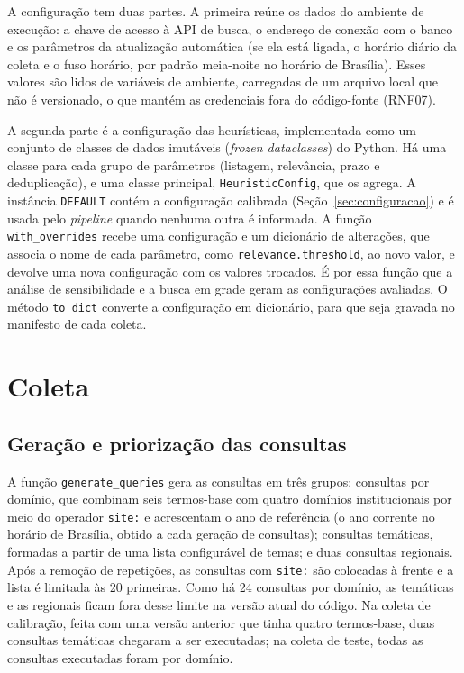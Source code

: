 A configuração tem duas partes. A primeira reúne os dados do ambiente de
execução: a chave de acesso à API de busca, o endereço de conexão com o banco
e os parâmetros da atualização automática (se ela está ligada, o horário
diário da coleta e o fuso horário, por padrão meia-noite no horário de
Brasília). Esses valores são lidos de variáveis
de ambiente, carregadas de um arquivo local que não é versionado, o que mantém
as credenciais fora do código-fonte (RNF07).

A segunda parte é a configuração das heurísticas, implementada como um conjunto
de classes de dados imutáveis (\textit{frozen dataclasses}) do Python. Há uma
classe para cada grupo de parâmetros (listagem, relevância, prazo e
deduplicação), e uma classe principal, \texttt{HeuristicConfig}, que os
agrega. A instância \texttt{DEFAULT} contém a configuração calibrada
(Seção~\ref{sec:configuracao}) e é usada pelo \textit{pipeline} quando nenhuma
outra é informada. A função \texttt{with\_overrides} recebe uma configuração e
um dicionário de alterações, que associa o nome de cada parâmetro, como
\texttt{relevance.threshold}, ao novo valor, e devolve uma nova configuração com os valores trocados. É por essa função que a
análise de sensibilidade e a busca em grade geram as configurações avaliadas.
O método \texttt{to\_dict} converte a configuração em dicionário, para que seja
gravada no manifesto de cada coleta.

\section{Coleta}
\label{sec:impl_coleta}

\subsection{Geração e priorização das consultas}

A função \texttt{generate\_queries} gera as consultas em três grupos: consultas
por domínio, que combinam seis termos-base com quatro domínios institucionais
por meio do operador \texttt{site:} e acrescentam o ano de referência (o ano
corrente no horário de Brasília, obtido a cada geração de consultas);
consultas temáticas, formadas a partir de uma lista configurável de temas; e
duas consultas regionais. Após a remoção de repetições, as consultas com
\texttt{site:} são colocadas à frente e a lista é limitada às 20 primeiras.
Como há 24 consultas por domínio, as temáticas e as regionais ficam fora desse
limite na versão atual do código. Na coleta de calibração, feita com uma versão
anterior que tinha quatro termos-base, duas consultas temáticas chegaram a ser
executadas; na coleta de teste, todas as consultas executadas foram por
domínio.

